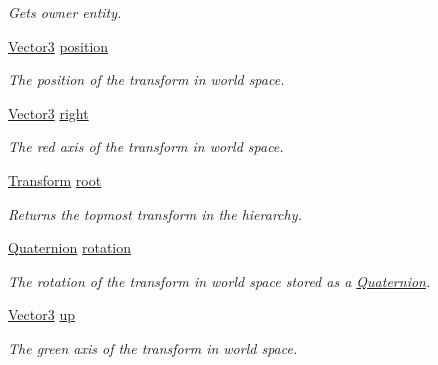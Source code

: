 \begin{DoxyCompactItemize}
\begin{DoxyCompactList}\small\item\em Gets owner entity. \end{DoxyCompactList}\item 
\mbox{\hyperlink{class_lua_1_1_vector3}{Vector3}} \mbox{\hyperlink{class_lua_1_1_transform_a789b6abed611a7576ca2262bb9c5e6c3}{position}}
\begin{DoxyCompactList}\small\item\em The position of the transform in world space. \end{DoxyCompactList}\item 
\mbox{\hyperlink{class_lua_1_1_vector3}{Vector3}} \mbox{\hyperlink{class_lua_1_1_transform_afa7cbcc49408b1a75564f5d379c877ac}{right}}
\begin{DoxyCompactList}\small\item\em The red axis of the transform in world space. \end{DoxyCompactList}\item 
\mbox{\hyperlink{class_lua_1_1_transform}{Transform}} \mbox{\hyperlink{class_lua_1_1_transform_ac54361eab00110ecfa6d6c53ffb78533}{root}}
\begin{DoxyCompactList}\small\item\em Returns the topmost transform in the hierarchy. \end{DoxyCompactList}\item 
\mbox{\hyperlink{class_lua_1_1_quaternion}{Quaternion}} \mbox{\hyperlink{class_lua_1_1_transform_ab0b5488416c3d0f6e3de7b426227198c}{rotation}}
\begin{DoxyCompactList}\small\item\em The rotation of the transform in world space stored as a \mbox{\hyperlink{class_lua_1_1_quaternion}{Quaternion}}. \end{DoxyCompactList}\item 
\mbox{\hyperlink{class_lua_1_1_vector3}{Vector3}} \mbox{\hyperlink{class_lua_1_1_transform_a98b72263be2f13a2917369c22b8539f3}{up}}
\begin{DoxyCompactList}\small\item\em The green axis of the transform in world space. \end{DoxyCompactList}\end{DoxyCompactItemize}


